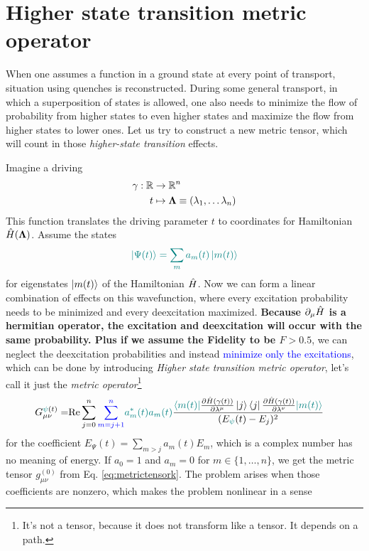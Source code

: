 \section{Higher state transition metric operator}


When one assumes a function in a ground state at every point of transport, situation using quenches is reconstructed. During some general transport, in which a superposition of states is allowed, one also needs to minimize the flow of probability from higher states to even higher states and maximize the flow from higher states to lower ones. Let us try to construct a new metric tensor, which will count in those \emph{higher-state transition} effects.

Imagine a driving
\begin{align*}
    \gamma:\mathbb{R} &\rightarrow \mathbb{R}^n \\
    t &\mapsto {\bm\Lambda}\equiv (\lambda_1,\dots \lambda_n)
\end{align*}
This function translates the driving parameter $t$ to coordinates for Hamiltonian $\hat{H}({\bm\Lambda})$. Assume the states
\begin{equation}
    \textcolor{teal}{\ket{\Psi(t)}=\sum_m a_m(t)\ket{m(t)}}
\end{equation}
for eigenstates $\ket{m(t)}$ of the Hamiltonian $\hat{H}$. Now we can form a linear combination of effects on this wavefunction, where every excitation probability needs to be minimized and every deexcitation maximized. \textbf{Because $\partial_\mu \hat{H}$ is a hermitian operator, the excitation and deexcitation will occur with the same probability. Plus if we assume the Fidelity to be $F>0.5$}, we can neglect the deexcitation probabilities and instead \textcolor{blue}{minimize only the excitations}, which can be done by introducing \emph{Higher state transition metric operator}, let's call it just the \emph{metric operator}\footnote{It's not a tensor, because it does not transform like a tensor. It depends on a path.}
\begin{equation}
    \begin{split}
        G_{\mu\nu}^{\textcolor{teal}{\psi}(t)} =& \text{Re} \sum\limits_{j=0}^n \textcolor{blue}{\sum_{m=j+1}^n}\textcolor{teal}{ a_m^*(t)a_m(t)}\frac{\textcolor{teal}{\bra{m(t)}}\frac{\partial \hat{H}(\gamma(t))}{\partial \lambda^\mu}\ket{j}\bra{j}\frac{\partial \hat{H}(\gamma(t))}{\partial \lambda^\nu}\textcolor{teal}{\ket{m(t)}}}{(E_{\textcolor{teal}{\psi}}(t)-E_j)^2}
    \label{eq:metrictensorREdefinition}
    \end{split}
\end{equation}
for the coefficient $E_\Psi(t)=\sum_{m>j} a_m(t) E_m$, which is a complex number has no meaning of energy. If  $a_0=1$ and $a_m=0$ for $m\in\{1,\dots,n\}$, we get the metric tensor $g^{(0)}_{\mu\nu}$ from Eq. \ref{eq:metrictensork}. The problem arises when those coefficients are nonzero, which makes the problem nonlinear in a sense

